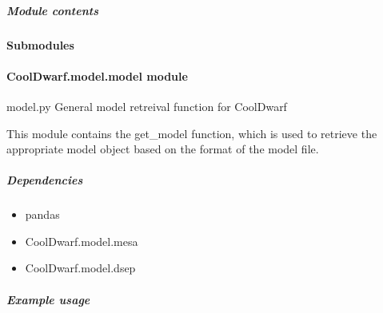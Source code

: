 \documentclass[letterpaper,10pt,english]{sphinxmanual}
\begin{document}
\subparagraph{Module contents}
\label{\detokenize{CoolDwarf.model.mesa:module-CoolDwarf.model.mesa}}\label{\detokenize{CoolDwarf.model.mesa:module-contents}}

\paragraph{Submodules}
\label{\detokenize{CoolDwarf.model:submodules}}

\paragraph{CoolDwarf.model.model module}
\label{\detokenize{CoolDwarf.model:module-CoolDwarf.model.model}}\label{\detokenize{CoolDwarf.model:cooldwarf-model-model-module}}
\sphinxAtStartPar
model.py \textendash{} General model retreival function for CoolDwarf

\sphinxAtStartPar
This module contains the get\_model function, which is used to retrieve the appropriate model object based on the format
of the model file.


\subparagraph{Dependencies}
\label{\detokenize{CoolDwarf.model:dependencies}}\begin{itemize}
\item {} 
\sphinxAtStartPar
pandas

\item {} 
\sphinxAtStartPar
CoolDwarf.model.mesa

\item {} 
\sphinxAtStartPar
CoolDwarf.model.dsep

\end{itemize}


\subparagraph{Example usage}
\label{\detokenize{CoolDwarf.model:example-usage}}
\begin{sphinxVerbatim}[commandchars=\\\{\}]
   
   
\end{sphinxVerbatim}
\end{document}
